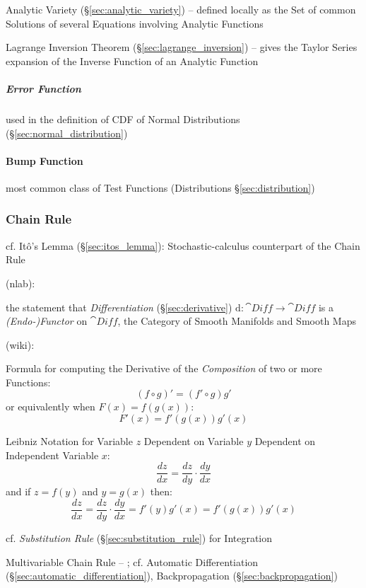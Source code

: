 {Analytic Variety (\S\ref{sec:analytic_variety}) -- defined locally as the Set of
common Solutions of several Equations involving Analytic Functions

Lagrange Inversion Theorem (\S\ref{sec:lagrange_inversion}) -- gives the Taylor
Series expansion of the Inverse Function of an Analytic Function



\subparagraph{Error Function}\label{sec:error_function}\hfill

used in the definition of CDF of Normal Distributions
(\S\ref{sec:normal_distribution})



\paragraph{Bump Function}\label{sec:bump_function}\hfill

most common class of Test Functions (Distributions \S\ref{sec:distribution})



\subsubsection{Chain Rule}\label{sec:chain_rule}

cf. It\^o's Lemma (\S\ref{sec:itos_lemma}): Stochastic-calculus counterpart of
the Chain Rule

(nlab):

the statement that \emph{Differentiation} (\S\ref{sec:derivative}) $\mathrm{d} :
\cat{Diff} \rightarrow \cat{Diff}$ is a \emph{(Endo-)Functor} on $\cat{Diff}$,
the Category of Smooth Manifolds and Smooth Maps

(wiki):

Formula for computing the Derivative of the \emph{Composition} of two or more
Functions:
\[
  (f \circ g)' = (f' \circ g) g'
\]
or equivalently when $F(x) = f(g(x))$:
\[
  F'(x) = f'(g(x))g'(x)
\]

Leibniz Notation for Variable $z$ Dependent on Variable $y$ Dependent on
Independent Variable $x$:
\[
  \frac{dz}{dx} = \frac{dz}{dy} \cdot \frac{dy}{dx}
\]
and if $z = f(y)$ and $y = g(x)$ then:
\[
  \frac{dz}{dx} = \frac{dz}{dy} \cdot \frac{dy}{dx}
    = f'(y)g'(x) = f'(g(x))g'(x)
\]

\fist cf. \emph{Substitution Rule} (\S\ref{sec:substitution_rule}) for
Integration

Multivariable Chain Rule -- ; cf. Automatic Differentiation
(\S\ref{sec:automatic_differentiation}), Backpropagation
(\S\ref{sec:backpropagation})

}
